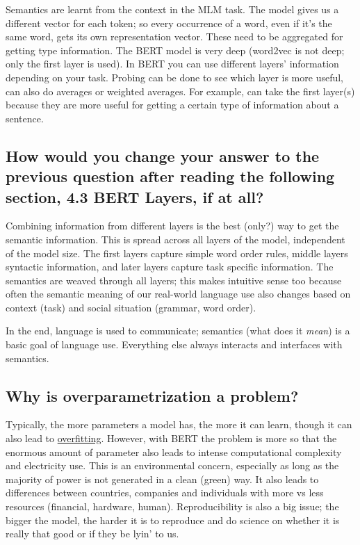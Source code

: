 \documentclass[
  11pt,
  british,
]{article}
\begin{document}
Semantics are learnt from the context in the MLM task. The model gives
us a different vector for each token; so every occurrence of a word,
even if it's the same word, gets its own representation vector. These
need to be aggregated for getting type information. The BERT model is
very deep (word2vec is not deep; only the first layer is used). In BERT
you can use different layers' information depending on your task.
Probing can be done to see which layer is more useful, can also do
averages or weighted averages. For example, can take the first layer(s)
because they are more useful for getting a certain type of information
about a sentence.

\hypertarget{how-would-you-change-your-answer-to-the-previous-question-after-reading-the-following-section-4.3-bert-layers-if-at-all}{%
\subsection{How would you change your answer to the previous question
after reading the following section, 4.3 BERT Layers, if at
all?}\label{how-would-you-change-your-answer-to-the-previous-question-after-reading-the-following-section-4.3-bert-layers-if-at-all}}

Combining information from different layers is the best (only?) way to
get the semantic information. This is spread across all layers of the
model, independent of the model size. The first layers capture simple
word order rules, middle layers syntactic information, and later layers
capture task specific information. The semantics are weaved through all
layers; this makes intuitive sense too because often the semantic
meaning of our real-world language use also changes based on context
(task) and social situation (grammar, word order).

In the end, language is used to communicate; semantics (what does it
\emph{mean}) is a basic goal of language use. Everything else always
interacts and interfaces with semantics.

\hypertarget{why-is-overparametrization-a-problem}{%
\subsection{Why is overparametrization a
problem?}\label{why-is-overparametrization-a-problem}}

Typically, the more parameters a model has, the more it can learn,
though it can also lead to
\href{../Prediction/Overfitting.md}{overfitting}. However, with BERT the
problem is more so that the enormous amount of parameter also leads to
intense computational complexity and electricity use. This is an
environmental concern, especially as long as the majority of power is
not generated in a clean (green) way. It also leads to differences
between countries, companies and individuals with more vs less resources
(financial, hardware, human). Reproducibility is also a big issue; the
bigger the model, the harder it is to reproduce and do science on
whether it is really that good or if they be lyin' to us.
\end{document}
